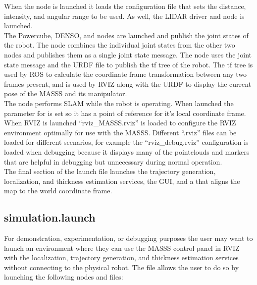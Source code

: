 When the  node is launched it loads the configuration file that sets the distance, intensity, and angular range to be used. As well, the LIDAR driver and  node is launched.\\

The Powercube, DENSO, and  nodes are launched and publish the joint states of the robot. The  node combines the individual joint states from the other two nodes and publishes them as a single joint state message. The node  uses the joint state message and the URDF file to publish the tf tree of the robot. The tf tree is used by ROS to calculate the coordinate frame transformation between any two frames present, and is used by RVIZ along with the URDF to display the current pose of the MASSS and its manipulator.\\

The node  performs SLAM while the robot is operating. When launched the parameter for  is set so it has a point of reference for it's local coordinate frame.\\

When RVIZ is launched ``rviz\_MASSS.rviz'' is loaded to configure the RVIZ environment optimally for use with the MASSS. Different ``.rviz'' files can be loaded for different scenarios, for example the ``rviz\_debug.rviz'' configuration is loaded when debugging because it displays many of the pointclouds and markers that are helpful in debugging but unnecessary during normal operation.\\

The final section of the launch file launches the trajectory generation, localization, and thickness estimation services, the  GUI, and a  that aligns the map to the world coordinate frame.\\

\subsection{simulation.launch}

For demonstration, experimentation, or debugging purposes the user may want to launch an environment where they can use the MASSS control panel in RVIZ with the localization, trajectory generation, and thickness estimation services without connecting to the physical robot. The  file allows the user to do so by launching the following nodes and files:

